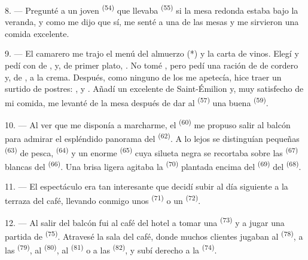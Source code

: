 8. --- Pregunté a un joven  \textsuperscript{(54)} que llevaba
 \textsuperscript{(55)} si la mesa redonda estaba bajo la
veranda, y como me dijo que sí, me senté a una de las mesas y me sirvieron
una comida excelente.


\VUsaut{4.0mm}
\VUsaut{3.0mm}

9. --- El camarero me trajo el menú del almuerzo (*) y la carta de vinos.
Elegí y pedí  con  de
, y, de primer plato, . No
tomé , pero pedí una ración de  de cordero y,
de ,  a la crema. Después, como ninguno de
los  me apetecía, hice traer un surtido de postres:
,  y . Añadí un excelente
 de Saint-Émilion y, muy satisfecho de mi comida, me levanté
de la mesa después de dar al  \textsuperscript{(57)} una buena
 \textsuperscript{(59)}.

10. --- Al ver que me disponía a marcharme, el 
\textsuperscript{(60)} me propuso salir al balcón para admirar el espléndido
panorama del  \textsuperscript{(62)}. A lo lejos se distinguían
pequeñas  \textsuperscript{(63)} de pesca, 
\textsuperscript{(64)} y un enorme  \textsuperscript{(65)} cuya
silueta negra se recortaba sobre las  \textsuperscript{(67)} blancas
del  \textsuperscript{(66)}. Una brisa ligera agitaba la
 \textsuperscript{(70)} plantada encima del 
\textsuperscript{(69)} del  \textsuperscript{(68)}.

\VUsaut{3.0mm}
\VUsaut{3.0mm}

11. --- El espectáculo era tan interesante que decidí subir al día
siguiente a la terraza del café, llevando conmigo unos 
\textsuperscript{(71)} o un  \textsuperscript{(72)}.

12. --- Al salir del balcón fui al café del hotel a tomar una
 \textsuperscript{(73)} y a jugar una partida de
 \textsuperscript{(75)}. Atravesé la sala del café, donde muchos
clientes jugaban al  \textsuperscript{(78)}, a las 
\textsuperscript{(79)}, al  \textsuperscript{(80)}, al 
\textsuperscript{(81)} o a las  \textsuperscript{(82)}, y subí derecho a la
 \textsuperscript{(74)}.

